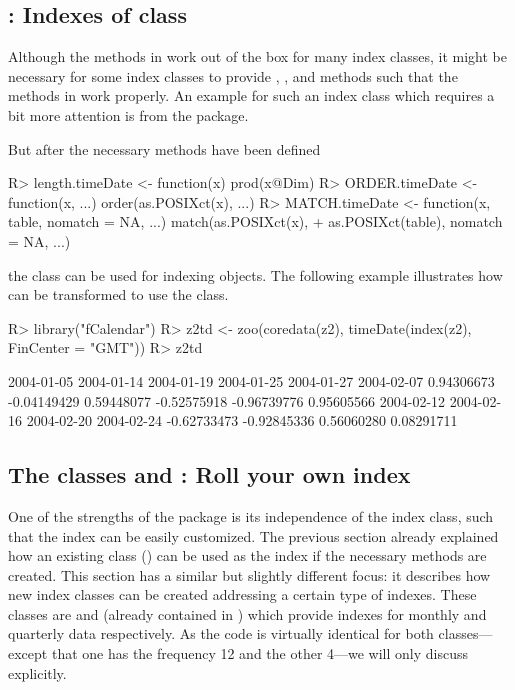 \documentclass{Z}
\begin{document}
\subsection[fCalendar: Indexes of class "timeDate"]{: Indexes of class }
\label{sec:fCalendar}

Although the methods in  work out of the box for many index classes,
it might be necessary for some index classes to provide , ,
 and  methods such that the methods in  
work properly. An example for such an index class which requires a bit more
attention is  from the  package.

But after the necessary methods have been defined
\begin{Schunk}
\begin{Sinput}
R> length.timeDate <- function(x) prod(x@Dim)
R> ORDER.timeDate <- function(x, ...) order(as.POSIXct(x), ...)
R> MATCH.timeDate <- function(x, table, nomatch = NA, ...) match(as.POSIXct(x), 
+     as.POSIXct(table), nomatch = NA, ...)
\end{Sinput}
\end{Schunk}
the class  can be used for indexing  objects.
The following example illustrates how  can be transformed
to use the  class.
\begin{Schunk}
\begin{Sinput}
R> library("fCalendar")
R> z2td <- zoo(coredata(z2), timeDate(index(z2), FinCenter = "GMT"))
R> z2td
\end{Sinput}
\begin{Soutput}
 2004-01-05  2004-01-14  2004-01-19  2004-01-25  2004-01-27  2004-02-07 
 0.94306673 -0.04149429  0.59448077 -0.52575918 -0.96739776  0.95605566 
 2004-02-12  2004-02-16  2004-02-20  2004-02-24 
-0.62733473 -0.92845336  0.56060280  0.08291711 
\end{Soutput}
\end{Schunk}

\subsection[The classes "yearmon" and "yearqtr": Roll your own index]{The classes  and : Roll your own index}
\label{sec:yearmon}

One of the strengths of the  package is its independence of the
index class, such that the index can be easily customized. The previous section
already explained how an existing class () can be used as
the index if the necessary methods are created. This section has a similar
but slightly different focus: it describes how new index classes can be created
addressing a certain type of indexes. These classes are  and
 (already contained in ) which provide indexes for
monthly and quarterly data respectively.
As the code is virtually identical for both classes---except that one has the 
frequency 12 and the other 4---we will only discuss  explicitly.
\end{document}
